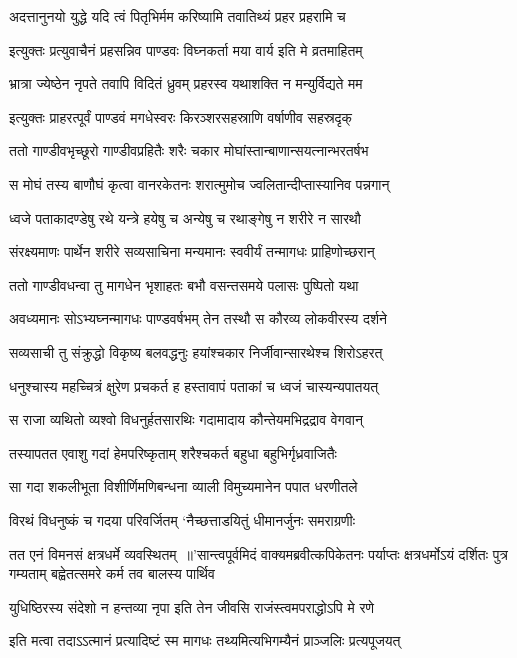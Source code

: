 \twolineshloka
{अदत्तानुनयो युद्धे यदि त्वं पितृभिर्मम}
{करिष्यामि तवातिथ्यं प्रहर प्रहरामि च}


\twolineshloka
{इत्युक्तः प्रत्युवाचैनं प्रहसन्निव पाण्डवः}
{विघ्नकर्ता मया वार्य इति मे व्रतमाहितम्}


\twolineshloka
{भ्रात्रा ज्येष्ठेन नृपते तवापि विदितं ध्रुवम्}
{प्रहरस्व यथाशक्ति न मन्युर्विद्यते मम}


\twolineshloka
{इत्युक्तः प्राहरत्पूर्वं पाण्डवं मगधेस्वरः}
{किरञ्शरसहस्राणि वर्षाणीव सहस्रदृक्}


\twolineshloka
{ततो गाण्डीवभृच्छूरो गाण्डीवप्रहितैः शरैः}
{चकार मोघांस्तान्बाणान्सयत्नान्भरतर्षभ}


\twolineshloka
{स मोघं तस्य बाणौघं कृत्वा वानरकेतनः}
{शरात्मुमोच ज्वलितान्दीप्तास्यानिव पन्नगान्}


\twolineshloka
{ध्वजे पताकादण्डेषु रथे यन्त्रे हयेषु च}
{अन्येषु च रथाङ्गेषु न शरीरे न सारथौ}


\twolineshloka
{संरक्ष्यमाणः पार्थेन शरीरे सव्यसाचिना}
{मन्यमानः स्ववीर्यं तन्मागधः प्राहिणोच्छरान्}


\twolineshloka
{ततो गाण्डीवधन्वा तु मागधेन भृशाहतः}
{बभौ वसन्तसमये पलासः पुष्पितो यथा}


\twolineshloka
{अवध्यमानः सोऽभ्यघ्नन्मागधः पाण्डवर्षभम्}
{तेन तस्थौ स कौरव्य लोकवीरस्य दर्शने}


\twolineshloka
{सव्यसाची तु संक्रुद्धो विकृष्य बलवद्धनुः}
{हयांश्चकार निर्जीवान्सारथेश्च शिरोऽहरत्}


\twolineshloka
{धनुश्चास्य महच्चित्रं क्षुरेण प्रचकर्त ह}
{हस्तावापं पताकां च ध्वजं चास्यन्यपातयत्}


\twolineshloka
{स राजा व्यथितो व्यश्वो विधनुर्हतसारथिः}
{गदामादाय कौन्तेयमभिद्रद्राव वेगवान्}


\twolineshloka
{तस्यापतत एवाशु गदां हेमपरिष्कृताम्}
{शरैश्चकर्त बहुधा बहुभिर्गृध्रवाजितैः}


\twolineshloka
{सा गदा शकलीभूता विशीर्णिमणिबन्धना}
{व्याली विमुच्यमानेन पपात धरणीतले}


\twolineshloka
{विरथं विधनुष्कं च गदया परिवर्जितम्}
{`नैच्छत्ताडयितुं धीमानर्जुनः समराग्रणीः}


तत एनं विमनसं क्षत्रधर्मे व्यवस्थितम् ॥'सान्त्वपूर्वमिदं वाक्यमब्रवीत्कपिकेतनः
\twolineshloka
{पर्याप्तः क्षत्रधर्मोऽयं दर्शितः पुत्र गम्यताम्}
{बह्वेतत्समरे कर्म तव बालस्य पार्थिव}


\twolineshloka
{युधिष्ठिरस्य संदेशो न हन्तव्या नृपा इति}
{तेन जीवसि राजंस्त्वमपराद्धोऽपि मे रणे}


\twolineshloka
{इति मत्वा तदाऽऽत्मानं प्रत्यादिष्टं स्म मागधः}
{तथ्यमित्यभिगम्यैनं प्राञ्जलिः प्रत्यपूजयत्}



